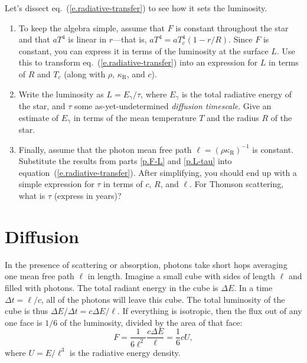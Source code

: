 \begin{exercisebox}
\label{ex.radiative-transfer-diffusion}
Let's dissect eq.~(\ref{e.radiative-transfer}) to see how it sets the luminosity.  
\begin{enumerate}
\item\label{p.F-L}
To keep the algebra simple, assume that $F$ is constant throughout the star and that $aT^{4}$ is linear in $r$---that is, $aT^{4} = aT_{c}^{4}(1-r/R)$.  Since $F$ is constant, you can express it in terms of the luminosity at the surface $L$.  Use this to transform eq.~(\ref{e.radiative-transfer}) into an expression for $L$ in terms of $R$ and $T_{c}$ (along with $\rho$, $\kappa_{\mathrm{R}}$, and $c$).

\item\label{p.L-tau}
Write the luminosity as $L = E_{\gamma}/\tau$, where $E_{\gamma}$ is the total radiative energy of the star, and $\tau$ some as-yet-undetermined \emph{diffusion timescale}.  Give an estimate of $E_{\gamma}$ in terms of the mean temperature $T$ and the radius $R$ of the star.

\item\label{p.tau}
Finally, assume that the photon mean free path $\ell = (\rho\kappa_{\mathrm{R}})^{-1}$ is constant.  Substitute the results from parts \ref{p.F-L} and \ref{p.L-tau} into equation~(\ref{e.radiative-transfer}).  After simplifying, you should end up with a simple expression for $\tau$ in terms of $c$, $R$, and $\ell$.  For Thomson scattering, what is $\tau$ (express in years)?
\end{enumerate}
\end{exercisebox}

\section{Diffusion}\label{s.diffusion}

In the presence of scattering or absorption, photons take short hops averaging one mean free path $\ell$ in length. Imagine a small cube with sides of length $\ell$ and filled with photons. The total radiant energy in the cube is $\Delta E$. In a time $\Delta t = \ell/c$, all of the photons will leave this cube. The total luminosity of the cube is thus $\Delta E/\Delta t = c\Delta E/\ell$. If everything is isotropic, then the flux out of any one face is $1/6$ of the luminosity, divided by the area of that face:
\[
	F = \frac{1}{6\ell^{2}}\frac{c\Delta E}{\ell} = \frac{1}{6}c U,
\]
where $U = E/\ell^{3}$ is the radiative energy density. 

